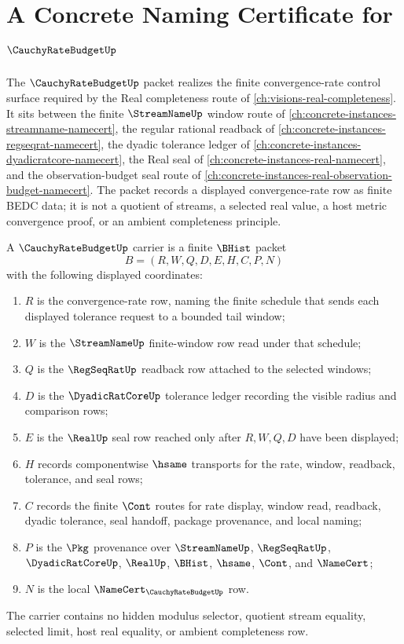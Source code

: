 \chapter{A Concrete Naming Certificate for $\CauchyRateBudgetUp$}
\label{ch:concrete-instances-cauchy-rate-budget-namecert}

The $\CauchyRateBudgetUp$ packet realizes the finite convergence-rate control surface required by the Real completeness route of \autoref{ch:visions-real-completeness}. It sits between the finite $\StreamNameUp$ window route of \autoref{ch:concrete-instances-streamname-namecert}, the regular rational readback of \autoref{ch:concrete-instances-regseqrat-namecert}, the dyadic tolerance ledger of \autoref{ch:concrete-instances-dyadicratcore-namecert}, the Real seal of \autoref{ch:concrete-instances-real-namecert}, and the observation-budget seal route of \autoref{ch:concrete-instances-real-observation-budget-namecert}. The packet records a displayed convergence-rate row as finite BEDC data; it is not a quotient of streams, a selected real value, a host metric convergence proof, or an ambient completeness principle.

\begin{definition}
\label{def:cauchy-rate-budget-carrier}
A $\CauchyRateBudgetUp$ carrier is a finite $\BHist$ packet
$$
B=(R,W,Q,D,E,H,C,P,N)
$$
with the following displayed coordinates:
\begin{enumerate}
\item $R$ is the convergence-rate row, naming the finite schedule that sends each displayed tolerance request to a bounded tail window;
\item $W$ is the $\StreamNameUp$ finite-window row read under that schedule;
\item $Q$ is the $\RegSeqRatUp$ readback row attached to the selected windows;
\item $D$ is the $\DyadicRatCoreUp$ tolerance ledger recording the visible radius and comparison rows;
\item $E$ is the $\RealUp$ seal row reached only after $R,W,Q,D$ have been displayed;
\item $H$ records componentwise $\hsame$ transports for the rate, window, readback, tolerance, and seal rows;
\item $C$ records the finite $\Cont$ routes for rate display, window read, readback, dyadic tolerance, seal handoff, package provenance, and local naming;
\item $P$ is the $\Pkg$ provenance over $\StreamNameUp$, $\RegSeqRatUp$, $\DyadicRatCoreUp$, $\RealUp$, $\BHist$, $\hsame$, $\Cont$, and $\NameCert$;
\item $N$ is the local $\NameCert_{\CauchyRateBudgetUp}$ row.
\end{enumerate}
The carrier contains no hidden modulus selector, quotient stream equality, selected limit, host real equality, or ambient completeness row.
\end{definition}

